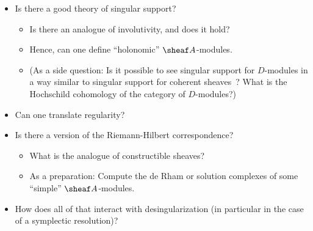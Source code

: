 \documentclass[english,no-theorem-numbers]{short-notes}
\begin{document}
\begin{itemize}
\begin{itemize}
        \end{itemize}
    \item Is there a good theory of singular support?
        \begin{itemize}
            \item Is there an analogue of involutivity, and does it hold?
            \item Hence, can one define \enquote{holonomic} $\sheaf A$-modules.
            \item (As a side question: Is it possible to see singular support for $D$-modules in a way similar to singular support for coherent sheaves~\cite{ArinkinGaitsgory:arXiv:SingularSupport}? What is the Hochschild cohomology of the category of $D$-modules?)
        \end{itemize}
    \item Can one translate regularity?
    \item Is there a version of the Riemann-Hilbert correspondence?
        \begin{itemize}
            \item What is the analogue of constructible sheaves?
            \item As a preparation: Compute the de Rham or solution complexes of some \enquote{simple} $\sheaf A$-modules.
        \end{itemize}
    \item How does all of that interact with desingularization (in particular in the case of a symplectic resolution)?
\end{itemize}

\printbibliography
\end{document}
